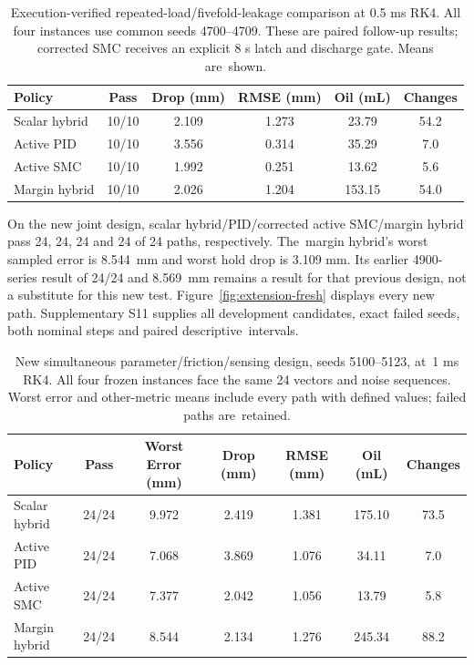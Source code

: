 \documentclass[machines,article,submit,pdftex,moreauthors]{Definitions/mdpi}
\begin{document}
\begin{table}[H]

\caption{Execution-verified
 repeated-load/fivefold-leakage comparison at 0.5 ms RK4. All four instances use common seeds 4700--4709. These are paired follow-up results; corrected SMC receives an explicit 8 s latch and discharge gate. Means are~shown.}\label{tab:extension-nominal}
\small
\begin{tabularx}{\textwidth}{l CCCCC}\toprule
\textbf{Policy} & \textbf{Pass} & \textbf{Drop (mm)} & \textbf{RMSE (mm)} & \textbf{Oil (mL)} & \textbf{Changes}\\\midrule
Scalar hybrid & 10/10 & 2.109 & 1.273 & 23.79 & 54.2\\
Active PID & 10/10 & 3.556 & 0.314 & 35.29 & 7.0\\
Active SMC & 10/10 & 1.992 & 0.251 & 13.62 & 5.6\\
Margin hybrid & 10/10 & 2.026 & 1.204 & 153.15 & 54.0\\
\bottomrule\end{tabularx}\end{table}

On the new joint design, scalar hybrid/PID/corrected active SMC/margin hybrid pass 24, 24, 24 and 24 of 24 paths, respectively. The~margin hybrid's worst sampled error is \mbox{8.544 mm} and worst hold drop is 3.109 mm. Its earlier 4900-series result of 24/24 and \mbox{8.569 mm} remains a result for that previous design, not a substitute for this new test. Figure~\ref{fig:extension-fresh} displays every new path. Supplementary S11 supplies all development candidates, exact failed seeds, both nominal steps and paired descriptive~intervals.

\begin{table}[H]
\caption{New simultaneous parameter/friction/sensing design, seeds 5100--5123, at~1 ms RK4. All four frozen instances face the same 24 vectors and noise sequences. Worst error and other-metric means include every path with defined values; failed paths are~retained.}\label{tab:extension-fresh}
\small
\begin{tabularx}{\textwidth}{l c C cc c c}\toprule
\textbf{Policy} & \textbf{Pass} & \textbf{Worst Error (mm)} & \textbf{Drop (mm)} & \textbf{RMSE (mm)} & \textbf{Oil (mL)} & \textbf{Changes}\\\midrule
Scalar hybrid & 24/24 & 9.972 & 2.419 & 1.381 & 175.10 & 73.5\\
Active PID & 24/24 & 7.068 & 3.869 & 1.076 & 34.11 & 7.0\\
Active SMC & 24/24 & 7.377 & 2.042 & 1.056 & 13.79 & 5.8\\
Margin hybrid & 24/24 & 8.544 & 2.134 & 1.276 & 245.34 & 88.2\\
\bottomrule\end{tabularx}\end{table}
\end{document}
